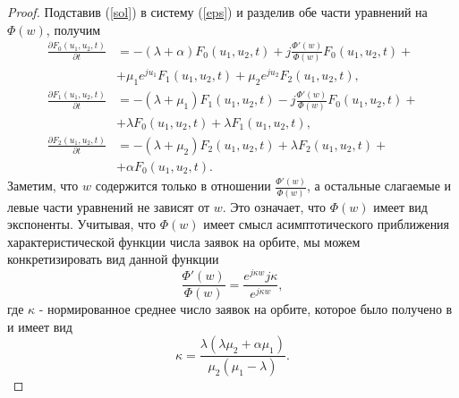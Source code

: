 \begin{proof}
Подставив (\ref{sol}) в систему (\ref{eps}) и разделив обе части уравнений на $\Phi(w)$, получим
\begin{equation} \label{preres}
	\begin{split}
		\frac{{\partial F_{0}(u_{1},u_{2},t)}}{{\partial t}} &= -(\lambda + \alpha)F_{0}(u_{1},u_{2},t) + j
		\frac{\Phi'(w) }{\Phi(w)}F_{0}(u_{1},u_{2},t) +\\  &+ \mu_{1} e^{ju_{1}}F_{1}(u_{1},u_{2},t) + \mu_{2}e^{ju_{2}}F_{2}(u_{1},u_{2},t) ,
		\\
		\frac{{\partial F_{1}(u_{1},u_{2},t)}}{{\partial t}} &= -(\lambda + \mu_{1})F_{1}(u_{1},u_{2},t) - j 
		\frac{\Phi'(w) }{\Phi(w)}F_{0}(u_{1},u_{2},t) +\\  &+ \lambda F_{0}(u_{1},u_{2},t) + \lambda F_{1}(u_{1},u_{2},t) ,
		\\
		\frac{{\partial F_{2}(u_{1},u_{2},t)}}{{\partial t}} &= -(\lambda + \mu_{2})F_{2}(u_{1},u_{2},t)  + \lambda F_{2}(u_{1},u_{2},t) +\\  &+ \alpha F_{0}(u_{1},u_{2},t).
	\end{split}
\end{equation}  
Заметим, что $w$ содержится только в отношении $\frac{\Phi'(w) }{\Phi(w)}$, а остальные слагаемые и левые части уравнений не зависят от $w$. Это означает, что  $\Phi(w)$ имеет вид экспоненты. Учитывая, что  $\Phi(w)$ имеет смысл асимптотического приближения характеристической функции числа заявок на орбите, мы можем конкретизировать вид данной функции
\begin{equation*}
\frac{\Phi'(w) }{\Phi(w)} = \frac{e^{j\kappa w}j\kappa}{e^{j\kappa w}},
\end{equation*} 
где $\kappa$ - нормированное среднее число заявок на орбите, которое было получено в \cite{nazarov2017asymptotic} и имеет вид 
\begin{equation*}
	\kappa = \frac{\lambda(\lambda \mu_{2} + \alpha \mu_{1})}{\mu_{2}(\mu_{1} - \lambda)}.
\end{equation*}


\end{proof}
